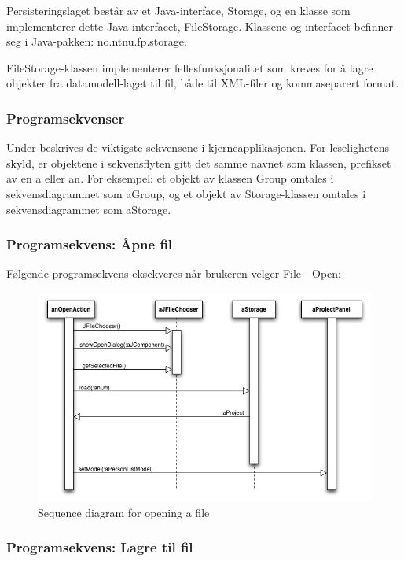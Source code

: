 \documentclass[a4paper]{scrartcl}
\begin{document}
Persisteringslaget består av et Java-interface, Storage, og en klasse som implementerer dette Java-interfacet, FileStorage. Klassene og interfacet befinner seg i Java-pakken: no.ntnu.fp.storage.

FileStorage-klassen implementerer fellesfunksjonalitet som kreves for å lagre objekter fra datamodell-laget til fil, både til XML-filer og kommaseparert format.

\subsubsection{Programsekvenser}

Under beskrives de viktigste sekvensene i kjerneapplikasjonen. For leselighetens skyld, er objektene i sekvensflyten gitt det samme navnet som klassen, prefikset av en a eller an. For eksempel: et objekt av klassen Group omtales i sekvensdiagrammet som aGroup, og et objekt av Storage-klassen omtales i sekvensdiagrammet som aStorage.


\subsubsection{Programsekvens: Åpne fil}

Følgende programsekvens eksekveres når brukeren velger File - Open:

\begin{figure}[H]
    \centering
    \includegraphics[width=\textwidth]{resources/sequence-open-file.jpg}
    \caption{Sequence diagram for opening a file}
    \label{fig:sequence-open-file}
\end{figure}

\subsubsection{Programsekvens: Lagre til fil}
\end{document}
